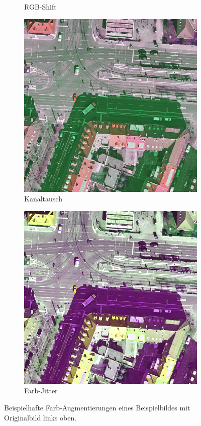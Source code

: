 \begin{figure}
\begin{subfigure}{.32\textwidth}
		RGB-Shift
	\end{subfigure}
	\begin{subfigure}{.32\textwidth}
		\centering
		\includegraphics[width=1.\linewidth]{Bilder/color_aug/ChannelShuffle.png}
		Kanaltausch
	\end{subfigure}
	\begin{subfigure}{.32\textwidth}
		\centering
		\includegraphics[width=1.\linewidth]{Bilder/color_aug/ColorJitter.png}
		Farb-Jitter
	\end{subfigure} 

	\caption{Beispielhafte Farb-Augmentierungen eines Beispielbildes mit Originalbild links oben. }
	\label{fig:color-aug}
\end{figure}

